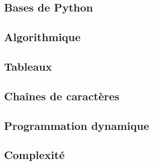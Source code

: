 \documentclass[10pt,fleqn]{article} %
\newcommand{\repStyle}{../../Style}
\begin{document}
\def\xxcompetences{}
\def\xxfigures{}

\graphicspath{{\repStyle/png/}}

\setlength{\columnseprule}{.1pt}




\pagestyle{fancy}
\thispagestyle{plain}


\proffalse

\begin{multicols}{2}
\section{Bases de Python}

\end{multicols}
\newpage

\begin{multicols}{2}
\section{Algorithmique}

\end{multicols}
\newpage

\begin{multicols}{2}
\section{Tableaux}

\end{multicols}
\newpage

\begin{multicols}{2}
\section{Chaînes de caractères}

\end{multicols}
\newpage

\begin{multicols}{2}
\section{Programmation dynamique}

\end{multicols}
\newpage

\begin{multicols}{2}
\section{Complexité}

\end{multicols}
\newpage
\end{document}
